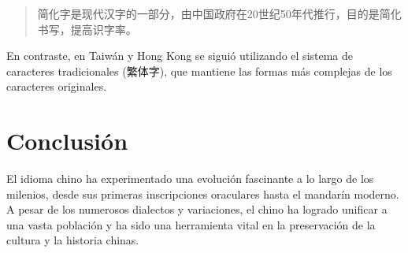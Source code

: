 \begin{quote}
\foreignlanguage{chinese}{
简化字是现代汉字的一部分，由中国政府在20世纪50年代推行，目的是简化书写，提高识字率。}
\end{quote}

En contraste, en Taiwán y Hong Kong se siguió utilizando el sistema de caracteres tradicionales (\foreignlanguage{chinese}{繁体字}), que mantiene las formas más complejas de los caracteres originales.

\section{Conclusión}

El idioma chino ha experimentado una evolución fascinante a lo largo de los milenios, desde sus primeras inscripciones oraculares hasta el mandarín moderno. A pesar de los numerosos dialectos y variaciones, el chino ha logrado unificar a una vasta población y ha sido una herramienta vital en la preservación de la cultura y la historia chinas.

